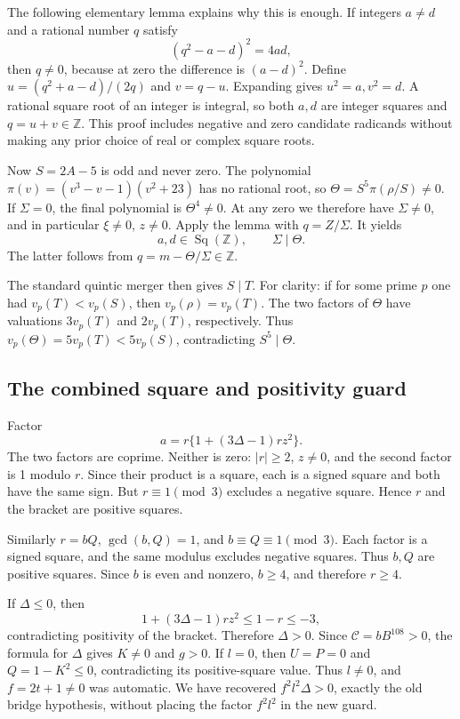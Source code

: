 The following elementary lemma explains why this is enough. If integers
\(a\ne d\) and a rational number \(q\) satisfy \[
 (q^2-a-d)^2=4ad,
\] then \(q\ne0\), because at zero the difference is \((a-d)^2\). Define
\(u=(q^2+a-d)/(2q)\) and \(v=q-u\). Expanding gives \(u^2=a,v^2=d\). A
rational square root of an integer is integral, so both \(a,d\) are
integer squares and \(q=u+v\in\mathbb Z\). This proof includes negative
and zero candidate radicands without making any prior choice of real or
complex square roots.

Now \(S=2A-5\) is odd and never zero. The polynomial
\(\pi(v)=(v^3-v-1)(v^2+23)\) has no rational root, so
\(\Theta=S^5\pi(\rho/S)\ne0\). If \(\Sigma=0\), the final polynomial is
\(\Theta^4\ne0\). At any zero we therefore have \(\Sigma\ne0\), and in
particular \(\xi\ne0\), \(z\ne0\). Apply the lemma with \(q=Z/\Sigma\).
It yields \[
 a,d\in\operatorname{Sq}(\mathbb Z),\qquad \Sigma\mid\Theta.
\] The latter follows from \(q=m-\Theta/\Sigma\in\mathbb Z\).

The standard quintic merger then gives \(S\mid T\). For clarity: if for
some prime \(p\) one had \(v_p(T)<v_p(S)\), then \(v_p(\rho)=v_p(T)\).
The two factors of \(\Theta\) have valuations \(3v_p(T)\) and
\(2v_p(T)\), respectively. Thus \(v_p(\Theta)=5v_p(T)<5v_p(S)\),
contradicting \(S^5\mid\Theta\).

\subsection{The combined square and positivity
guard}\label{the-combined-square-and-positivity-guard}

Factor \[
 a=r\{1+(3\Delta-1)rz^2\}.
\] The two factors are coprime. Neither is zero: \(|r|\ge2\), \(z\ne0\),
and the second factor is 1 modulo \(r\). Since their product is a
square, each is a signed square and both have the same sign. But
\(r\equiv1\pmod3\) excludes a negative square. Hence \(r\) and the
bracket are positive squares.

Similarly \(r=bQ\), \(\gcd(b,Q)=1\), and \(b\equiv Q\equiv1\pmod3\).
Each factor is a signed square, and the same modulus excludes negative
squares. Thus \(b,Q\) are positive squares. Since \(b\) is even and
nonzero, \(b\ge4\), and therefore \(r\ge4\).

If \(\Delta\le0\), then \[
 1+(3\Delta-1)rz^2\le1-r\le-3,
\] contradicting positivity of the bracket. Therefore \(\Delta>0\).
Since \(\mathcal C=bB^{108}>0\), the formula for \(\Delta\) gives
\(K\ne0\) and \(g>0\). If \(l=0\), then \(U=P=0\) and \(Q=1-K^2\le0\),
contradicting its positive-square value. Thus \(l\ne0\), and
\(f=2t+1\ne0\) was automatic. We have recovered \(f^2l^2\Delta>0\),
exactly the old bridge hypothesis, without placing the factor \(f^2l^2\)
in the new guard.

